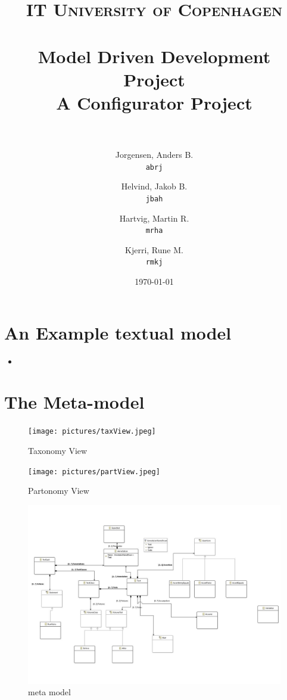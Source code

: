 \documentclass[paper=a4, fontsize=11pt]{scrartcl} %
\title{	
\normalfont \normalsize 
\textsc{IT University of Copenhagen} \\ [25pt] %
\horrule{0.5pt} \\[0.4cm] %
\huge Model Driven Development Project \\ %
\large A Configurator Project \\ %
\horrule{2pt} \\[0.5cm] %
}
\author{
  Jorgensen, Anders B.\\
  \texttt{abrj}
  \and
  Helvind, Jakob B.\\
  \texttt{jbah}
  \and
  Hartvig, Martin R.\\
  \texttt{mrha}
  \and
  Kjerri, Rune M.\\
  \texttt{rmkj}
}
\date{\normalsize\today} %
\numberwithin{equation}{section} %
\numberwithin{figure}{section} %
\numberwithin{table}{section} %
\newcommand{\java}[2]{
\begin{itemize}
\item[]
\end{itemize}
}
\begin{document}
\maketitle %
\newpage


\section{An Example textual model}
\java{../configproject/runtime-CarFactory/src/factory.smdpdsl}{Concrete syntax}

\section{The Meta-model}
\begin{figure}[ht!]
\centering
\texttt{[image: pictures/taxView.jpeg]}
\caption{Taxonomy View}
\end{figure}

\begin{figure}[ht!]
\centering
\texttt{[image: pictures/partView.jpeg]}
\caption{Partonomy View}
\end{figure}

\begin{figure}[ht!]
\centering
\includegraphics[scale=0.7]{pictures/mrha.pdf}
\caption{meta model}
\end{figure}
\end{document}
